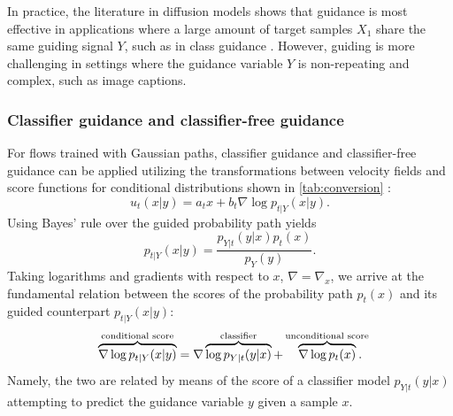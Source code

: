 \documentclass{fairmeta}
\numberwithin{equation}{section}
\begin{document}
In practice, the literature in diffusion models shows that guidance is most effective in applications where a large amount of target samples $X_1$ share the same guiding signal $Y$, such as in class guidance \citep{nichol2021improved}.
However, guiding is more challenging in settings where the guidance variable $Y$ is non-repeating and complex, such as image captions.


\subsubsection{Classifier guidance and classifier-free guidance}

For flows trained with Gaussian paths, classifier guidance \citep{song2021sde,dhariwal2021beat} and classifier-free guidance \citep{ho2021classifierfree} can be applied utilizing the transformations between velocity fields and score functions for conditional distributions shown in \cref{tab:conversion} \citep{zheng2023guided}:
\begin{equation}\label{e:score_to_velocity}
    u_t(x|y) = a_t x + b_t \nabla \log p_{t|Y}(x|y).
\end{equation}
Using Bayes' rule over the guided probability path yields 
\begin{equation}
    p_{t|Y}(x|y) = \frac{p_{Y|t}(y|x)p_t(x)}{p_Y(y)}.
\end{equation}
Taking logarithms and gradients with respect to $x$, $\nabla=\nabla_x$, we arrive at the fundamental relation between the scores of the probability path $p_t(x)$ and its guided counterpart $p_{t|Y}(x|y)$:
\begin{equation}\label{e:score_classifier_guidance}
     \overbrace{\nabla\log p_{t|Y}(x|y)}^{\text{{conditional score}}} = \nabla \overbrace{\log p_{Y|t}(y|x)}^{\text{{classifier}}} +  \overbrace{\nabla\log p_t(x)}^{\text{{unconditional score}}}\hspace{-10pt}.
\end{equation}
Namely, the two are related by means of the score of a classifier model $p_{Y|t}(y|x)$ attempting to predict the guidance variable $y$ given a sample $x$.
\end{document}
